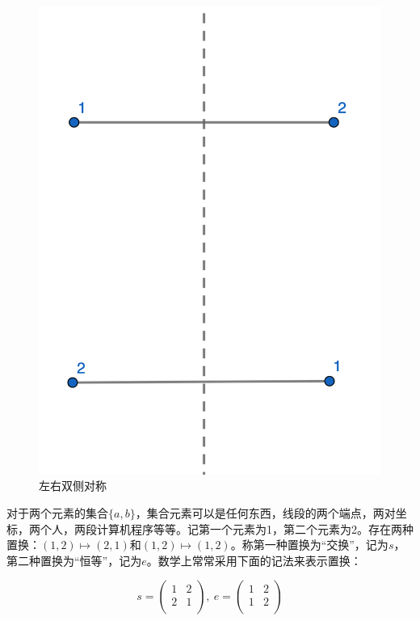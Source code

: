 \documentclass[b5paper]{ctexart}
\begin{document}
\begin{figure}[htbp]
  \centering
  \includegraphics[scale=0.8]{img/reflection.png}
  \caption{左右双侧对称}
  \label{fig:reflection}
\end{figure}

对于两个元素的集合$\{a, b\}$，集合元素可以是任何东西，线段的两个端点，两对坐标，两个人，两段计算机程序等等。记第一个元素为1，第二个元素为2。存在两种置换：$(1, 2) \mapsto (2, 1)$和$(1, 2) \mapsto (1, 2)$。称第一种置换为“交换”，记为$s$，第二种置换为“恒等”，记为$e$。数学上常常采用下面的记法来表示置换：

\[ s = \begin{pmatrix}
1 & 2 \\
2 & 1 \\
\end{pmatrix}
,\
e = \begin{pmatrix}
1 & 2 \\
1 & 2 \\
\end{pmatrix}
\]
\end{document}
